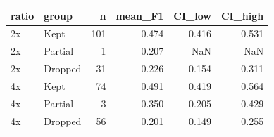 \begin{tabular}{llrrrr}
\toprule
ratio & group & n & mean_F1 & CI_low & CI_high \\
\midrule
2x & Kept & 101 & 0.474 & 0.416 & 0.531 \\
2x & Partial & 1 & 0.207 & NaN & NaN \\
2x & Dropped & 31 & 0.226 & 0.154 & 0.311 \\
4x & Kept & 74 & 0.491 & 0.419 & 0.564 \\
4x & Partial & 3 & 0.350 & 0.205 & 0.429 \\
4x & Dropped & 56 & 0.201 & 0.149 & 0.255 \\
\bottomrule
\end{tabular}
